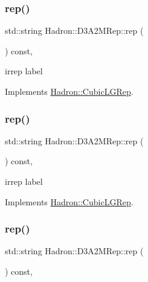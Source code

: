 \subsubsection{\texorpdfstring{rep()}{rep()}\hspace{0.1cm}{\footnotesize\ttfamily [1/3]}}
{\footnotesize\ttfamily std\+::string Hadron\+::\+D3\+A2\+M\+Rep\+::rep (\begin{DoxyParamCaption}{ }\end{DoxyParamCaption}) const\hspace{0.3cm}{\ttfamily [inline]}, {\ttfamily [virtual]}}

irrep label 

Implements \mbox{\hyperlink{structHadron_1_1CubicLGRep_a50f5ddbb8f4be4cee0106fa9e8c75e6c}{Hadron\+::\+Cubic\+L\+G\+Rep}}.

\mbox{\label{structHadron_1_1D3A2MRep_a64bf3c3f5c0fa0e49aa2f74421308ac3}} 
\subsubsection{\texorpdfstring{rep()}{rep()}\hspace{0.1cm}{\footnotesize\ttfamily [2/3]}}
{\footnotesize\ttfamily std\+::string Hadron\+::\+D3\+A2\+M\+Rep\+::rep (\begin{DoxyParamCaption}{ }\end{DoxyParamCaption}) const\hspace{0.3cm}{\ttfamily [inline]}, {\ttfamily [virtual]}}

irrep label 

Implements \mbox{\hyperlink{structHadron_1_1CubicLGRep_a50f5ddbb8f4be4cee0106fa9e8c75e6c}{Hadron\+::\+Cubic\+L\+G\+Rep}}.

\mbox{\label{structHadron_1_1D3A2MRep_a64bf3c3f5c0fa0e49aa2f74421308ac3}} 
\subsubsection{\texorpdfstring{rep()}{rep()}\hspace{0.1cm}{\footnotesize\ttfamily [3/3]}}
{\footnotesize\ttfamily std\+::string Hadron\+::\+D3\+A2\+M\+Rep\+::rep (\begin{DoxyParamCaption}{ }\end{DoxyParamCaption}) const\hspace{0.3cm}{\ttfamily [inline]}, {\ttfamily [virtual]}}

